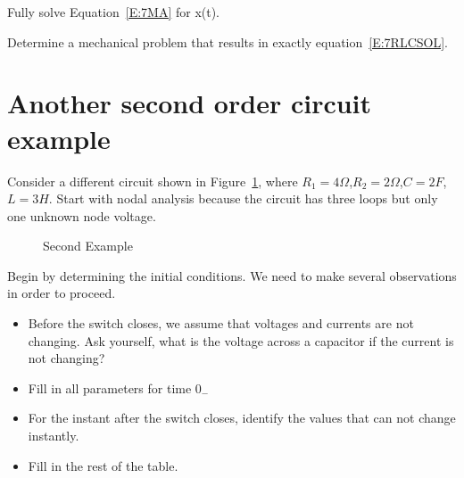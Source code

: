 \begin{clevel}
Fully solve Equation~\eqref{E:7MA} for x(t).
\end{clevel}

\begin{dlevel}
Determine a mechanical problem that results in exactly equation~\eqref{E:7RLCSOL}.
\end{dlevel}
\section{Another second order circuit example}
Consider a different circuit shown in Figure~\ref{F:7EX2}, where $R_1=4\Omega$,$R_2=2\Omega$,$C=2F$,$L=3H$. Start with nodal analysis because the circuit has three loops but only one unknown node voltage.

\begin{figure}[H]
\begin{center}
\caption{Second Example}
\label{F:7EX2}
\end{center}
\end{figure}

Begin by determining the initial conditions. We need to make several observations in order to proceed.
\begin{itemize}
\item Before the switch closes, we assume that voltages and currents are not changing. Ask yourself, what is the voltage across a capacitor if the current is not changing?
\item Fill in all parameters for time $0_-$
\item For the instant after the switch closes, identify the values that can not change instantly.
\item Fill in the rest of the table.
\end{itemize}

